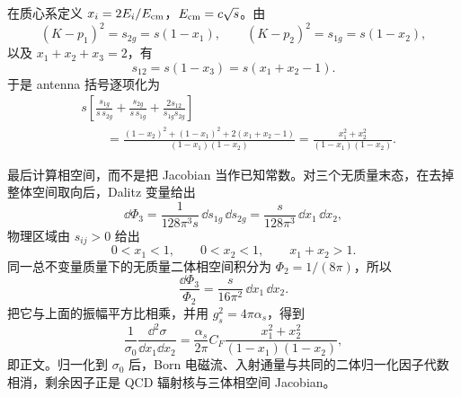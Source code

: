 \begin{derivation}
在质心系定义 $x_i=2E_i/E_{\rm cm}$，$E_{\rm cm}=c\sqrt s$。由
\begin{equation*}
(K-p_1)^2=s_{2g}=s(1-x_1),\qquad
(K-p_2)^2=s_{1g}=s(1-x_2),
\end{equation*}
以及 $x_1+x_2+x_3=2$，有
\begin{equation*}
s_{12}=s(1-x_3)=s(x_1+x_2-1).
\end{equation*}
于是 antenna 括号逐项化为
\begin{align*}
&s\left[
\frac{s_{1g}}{s\,s_{2g}}
+\frac{s_{2g}}{s\,s_{1g}}
+\frac{2s_{12}}{s_{1g}s_{2g}}
\right]\\
&\qquad=
\frac{(1-x_2)^2+(1-x_1)^2+2(x_1+x_2-1)}{(1-x_1)(1-x_2)}
=\frac{x_1^2+x_2^2}{(1-x_1)(1-x_2)}.
\end{align*}

最后计算相空间，而不是把 Jacobian 当作已知常数。对三个无质量末态，在去掉整体空间取向后，Dalitz 变量给出
\begin{equation*}
\dd\Phi_3
=\frac{1}{128\pi^3s}\,\dd s_{1g}\,\dd s_{2g}
=\frac{s}{128\pi^3}\,\dd x_1\,\dd x_2,
\end{equation*}
物理区域由 $s_{ij}>0$ 给出
\begin{equation*}
0<x_1<1,\qquad0<x_2<1,\qquad x_1+x_2>1.
\end{equation*}
同一总不变量质量下的无质量二体相空间积分为 $\Phi_2=1/(8\pi)$，所以
\begin{equation*}
\frac{\dd\Phi_3}{\Phi_2}
=\frac{s}{16\pi^2}\,\dd x_1\,\dd x_2.
\end{equation*}
把它与上面的振幅平方比相乘，并用 $g_s^2=4\pi\alpha_s$，得到
\begin{equation*}
\frac1{\sigma_0}
\frac{\dd^2\sigma}{\dd x_1\dd x_2}
=\frac{\alpha_s}{2\pi}C_F
\frac{x_1^2+x_2^2}{(1-x_1)(1-x_2)},
\end{equation*}
即正文。归一化到 $\sigma_0$ 后，Born 电磁流、入射通量与共同的二体归一化因子代数相消，剩余因子正是 QCD 辐射核与三体相空间 Jacobian。
\end{derivation}

